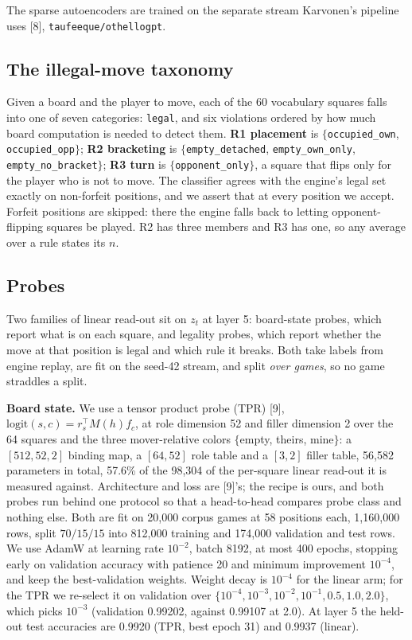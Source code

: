 \documentclass{article}
\begin{document}
The sparse autoencoders are trained on the separate stream Karvonen's pipeline uses [8],
\texttt{taufeeque/othellogpt}.

\subsection{The illegal-move taxonomy}

Given a board and the player to move, each of the 60 vocabulary squares falls into one of seven
categories: \texttt{legal}, and six violations ordered by how much board computation is needed
to detect them. \textbf{R1 placement} is $\{$\texttt{occupied\_own}, \texttt{occupied\_opp}$\}$;
\textbf{R2 bracketing} is $\{$\texttt{empty\_detached}, \texttt{empty\_own\_only},
\texttt{empty\_no\_bracket}$\}$; \textbf{R3 turn} is $\{$\texttt{opponent\_only}$\}$, a square
that flips only for the player who is not to move. The classifier agrees with the engine's legal
set exactly on non-forfeit positions, and we assert that at every position we accept. Forfeit
positions are skipped: there the engine falls back to letting opponent-flipping squares be
played. R2 has three members and R3 has one, so any average over a rule states its $n$.

\subsection{Probes}

Two families of linear read-out sit on $z_t$ at layer 5: board-state probes, which report what is
on each square, and legality probes, which report whether the move at that position is legal and
which rule it breaks. Both take labels from engine replay, are fit on the seed-42 stream, and
split \emph{over games}, so no game straddles a split.

\textbf{Board state.} We use a tensor product probe (TPR) [9],
$\mathrm{logit}(s, c) = r_s^\top M(h) f_c$, at role dimension 52 and filler dimension 2 over the
64 squares and the three mover-relative colors $\{$empty, theirs, mine$\}$: a $[512, 52, 2]$
binding map, a $[64, 52]$ role table and a $[3, 2]$ filler table, 56,582 parameters in total,
57.6\% of the 98,304 of the per-square linear read-out it is measured against. Architecture and loss are [9]'s; the recipe is ours, and both probes run behind one protocol so
that a head-to-head compares probe class and nothing else. Both are fit on 20,000 corpus games at
58 positions each, 1,160,000 rows, split $70/15/15$ into 812,000 training and 174,000 validation
and test rows. We use AdamW at learning rate $10^{-2}$, batch 8192, at most 400 epochs, stopping
early on validation accuracy with patience 20 and minimum improvement $10^{-4}$, and keep the
best-validation weights. Weight decay is $10^{-4}$ for the linear arm; for the TPR we re-select
it on validation over $\{10^{-4}, 10^{-3}, 10^{-2}, 10^{-1}, 0.5, 1.0, 2.0\}$, which picks
$10^{-3}$ (validation 0.99202, against 0.99107 at 2.0). At layer 5 the held-out test accuracies
are 0.9920 (TPR, best epoch 31) and 0.9937 (linear).
\end{document}
